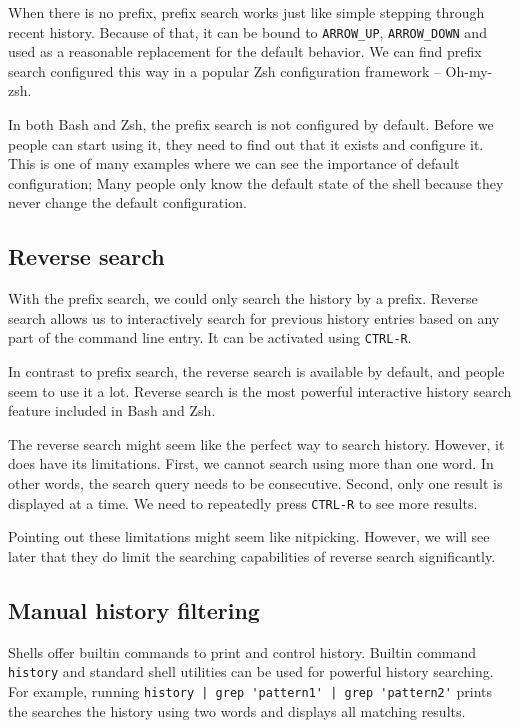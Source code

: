 When there is no prefix, prefix search works just like simple stepping through recent history. Because of that, it can be bound to \verb|ARROW_UP|, \verb|ARROW_DOWN| and used as a reasonable replacement for the default behavior. We can find prefix search configured this way in a popular Zsh configuration framework -- Oh-my-zsh\cite{toolsohmyzsh}.

In both Bash and Zsh, the prefix search is not configured by default. Before we people can start using it, they need to find out that it exists and configure it. This is one of many examples where we can see the importance of default configuration; Many people only know the default state of the shell because they never change the default configuration.

\subsection{Reverse search}

With the prefix search, we could only search the history by a prefix.
Reverse search allows us to interactively search for previous history entries based on any part of the command line entry. It can be activated using \verb|CTRL-R|.

In contrast to prefix search, the reverse search is available by default, and people seem to use it a lot. Reverse search is the most powerful interactive history search feature included in Bash and Zsh.

The reverse search might seem like the perfect way to search history. However, it does have its limitations. First, we cannot search using more than one word. In other words, the search query needs to be consecutive. Second, only one result is displayed at a time. We need to repeatedly press \verb|CTRL-R| to see more results.

Pointing out these limitations might seem like nitpicking. However, we will see later that they do limit the searching capabilities of reverse search significantly.


\subsection{Manual history filtering}

Shells offer builtin commands to print and control history. Builtin command \verb|history| and standard shell utilities can be used for powerful history searching.
For example, running \verb#history | grep 'pattern1' | grep 'pattern2'# prints the searches the history using two words and displays all matching results.

